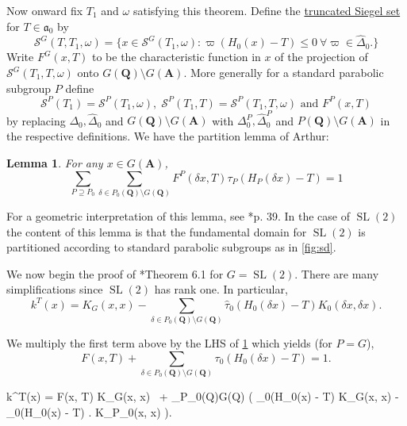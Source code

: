 \documentclass[11pt]{amsart}
\def\A{\mathbf A}
\def\Q{\mathbf Q}
\def\SSS{\mathcal S}
\def\aaa{\mathfrak a}
\def\cb#1{{\color{blue}#1}}
\def\bs{\setminus} 			%
\def\sl{\operatorname{SL}}
\newtheorem{lemma}[theorem]{Lemma}
\theoremstyle{remark}
\begin{document}
Now onward fix $T_1$ and $\omega$ satisfying this theorem. Define the \underline{truncated Siegel set} for $T \in \aaa_0$ by
\[ \SSS^G(T, T_1, \omega) = \{ x \in \SSS^G(T_1, \omega) : \varpi(H_0(x) - T) \leq 0 \ \forall \varpi \in \hat\Delta_0. \} \]
Write $F^G(x, T)$ to be the characteristic function in $x$ of the projection of $\SSS^G(T_1, T, \omega)$ onto $G(\Q)\bs G(\A)$. More generally for a standard parabolic subgroup $P$ define 
\[ \SSS^P(T_1) = \SSS^P(T_1, \omega), \; \SSS^P(T_1, T) = \SSS^P(T_1, T, \omega) \text{ and } F^P(x, T) \]
by replacing $\Delta_0, \hat\Delta_0$ and $G(\Q)\bs G(\A)$ with $\Delta_0^P, \hat \Delta_0^P$ and $P(\Q)\bs G(\A)$ in the respective definitions. We have the partition lemma of Arthur:
\begin{lemma} \label{partition_lemma}
	For any $x \in G(\A)$, 
	\[ \sum_{P \supseteq P_0} \sum_{\delta \in P_0(\Q) \bs G(\Q)} F^P(\delta x, T) \tau_P(H_P(\delta x) - T) = 1 \]
\end{lemma}
For a geometric interpretation of this lemma, see \cite{clay}*{p. 39}. \cb{In the case of $\sl(2)$ the content of this lemma is that the fundamental domain for $\sl(2)$ is partitioned according to standard parabolic subgroups as in \cref{fig:sd}. }

\cb{We now begin the proof of \cite{clay}*{Theorem 6.1} for $G=\sl(2)$. There are many simplifications since $\sl(2)$ has rank one. In particular,
\[ k^T(x) = K_G(x, x) - \sum_{\delta \in P_0(\Q)\bs G(\Q)} \hat\tau_0(H_0(\delta x) - T) K_0(\delta x, \delta x). \]
}

\cb{We multiply the first term above by the LHS of \cref{partition_lemma} which yields (for $P=G$),
\[ F(x, T) + \sum_{\delta \in P_0(\Q)\bs G(\Q)} \tau_0(H_0(\delta x) - T) = 1. \]
\begin{flalign*} 
	\therefore k^T(x) = F(x, T) K_G(x, x) \ +  
	\sum_{\delta \in P_0(\Q)\bs G(\Q)} \left( 
		\tau_0(H_0(\delta x) - T) K_G(\delta x, \delta x)
		- \hat\tau_0(H_0(\delta x) - T) . K_{P_0}(\delta x, \delta x) \right).
\end{flalign*}
}
\end{document}
